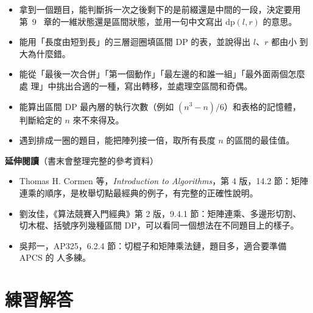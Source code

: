 \begin{itemize}
\item 拿到一個題目，能判斷拆一次之後剩下的是前綴還是中間的一段，決定要用第~9~
章的一維狀態還是區間狀態，並用一句中文寫出 $\mathrm{dp}(l, r)$ 的意思。
\item 能用「長度由短到長」的三層迴圈填區間 DP 的表，並說得出 $l$、$r$ 都由小
到大為什麼錯。
\item 能從「最後一次合併」「第一個動作」「最左邊的和誰一組」「最外面兩個怎麼處
理」中挑出合適的一種，寫出轉移，並處理空區間和奇偶。
\item 能算出區間 DP 最內層的執行次數（例如 $(n^3 - n)/6$）和表格的記憶體，
判斷給定的 $n$ 來不來得及。
\item 遇到排成一圈的題目，能把陣列接一倍，取所有長度 $n$ 的區間的最佳值。
\end{itemize}

\textbf{延伸閱讀}（書末會整理完整的參考資料）

\begin{itemize}
\item Thomas H. Cormen 等，\textit{Introduction to Algorithms}，第 4 版，14.2
節：矩陣連乘的順序，是枚舉切點最經典的例子，有完整的正確性說明。
\item 劉汝佳，《算法競賽入門經典》第 2 版，9.4.1 節：矩陣連乘、多邊形切割、
切木棍、括號序列幾種區間 DP，可以看同一個想法在不同題目上的樣子。
\item 吳邦一，AP325，6.2.4 節：切棍子和矩陣乘法鏈，題目多，適合要準備 APCS 的
人多練。
\end{itemize}

\section*{練習解答}

